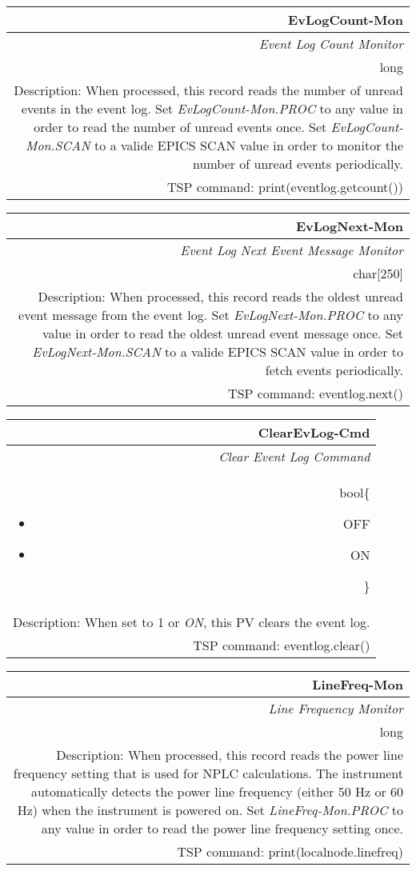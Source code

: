 \documentclass[openany]{article}
\begin{document}
		\begin{tabular}{N}
			\hline
			\bfseries EvLogCount-Mon\label{pv:evlogcount-mon} \\ \hline
			\emph{Event Log Count Monitor} \\
			long \\
			Description: When processed, this record reads the number of unread events in the event log. Set \emph{EvLogCount-Mon.PROC} to any value in order to read the number of unread events once. Set \emph{EvLogCount-Mon.SCAN} to a valide EPICS SCAN value in order to monitor the number of unread events periodically. \\
			TSP command: print(eventlog.getcount())
		\end{tabular}

		\begin{tabular}{N}
			\hline
			\bfseries EvLogNext-Mon\label{pv:evlognext-mon} \\ \hline
			\emph{Event Log Next Event Message Monitor} \\
			char[250] \\
			Description: When processed, this record reads the oldest unread event message from the event log. Set \emph{EvLogNext-Mon.PROC} to any value in order to read the oldest unread event message once. Set \emph{EvLogNext-Mon.SCAN} to a valide EPICS SCAN value in order to fetch events periodically. \\
			TSP command: eventlog.next()
		\end{tabular}

		\begin{tabular}{N}
			\hline
			\bfseries ClearEvLog-Cmd\label{pv:clearevlog-cmd} \\ \hline
			\emph{Clear Event Log Command} \\
			bool\{\begin{itemize}[noitemsep]
				\small
				\item[] OFF
				\item[] ON
			\end{itemize}\} \\
			Description: When set to 1 or \emph{ON}, this PV clears the event log. \\
			TSP command: eventlog.clear()
		\end{tabular}

		\begin{tabular}{N}
			\hline
			\bfseries LineFreq-Mon\label{pv:linefreq-mon} \\ \hline
			\emph{Line Frequency Monitor} \\
			long \\
			Description: When processed, this record reads the power line frequency setting that is used for NPLC calculations. The instrument automatically detects the power line frequency (either 50 Hz or 60 Hz) when the instrument is powered on. Set \emph{LineFreq-Mon.PROC} to any value in order to read the power line frequency setting once. \\
			TSP command: print(localnode.linefreq)
		\end{tabular}
\end{document}
